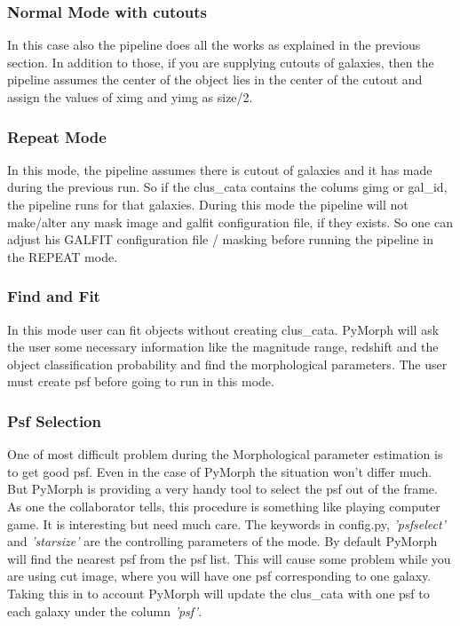 \documentclass[a4paper,12pt]{article}
\begin{document}
\subsubsection{Normal Mode with cutouts}
 In this case also the pipeline does all the works as explained in the previous section. In addition to those, if you are supplying cutouts of galaxies, then the pipeline assumes the center of the object lies in the center of the cutout and assign the values of ximg and yimg as size/2.
\subsubsection{Repeat Mode}
In this mode, the pipeline assumes there is cutout of galaxies and it has made during the previous run. So if the clus\_cata contains the colums gimg or gal\_id, the pipeline runs for that galaxies. During this mode the pipeline will not make/alter any mask image and galfit configuration file, if they exists. So one can adjust his GALFIT configuration file / masking before running the pipeline in the REPEAT mode.
\subsubsection{Find and Fit}
In this mode user can fit objects without creating clus\_cata. PyMorph will ask the user some necessary information like the magnitude range, redshift and the object classification probability and find the morphological
 parameters. The user must create psf before going to run in this mode.
\subsubsection{Psf Selection}
One of most difficult problem during the Morphological parameter estimation is to get good psf. Even in the case of PyMorph the situation won't differ much. But PyMorph is providing a very handy tool to select the psf out of the frame. As one the collaborator tells, this procedure is something like playing computer game. It is interesting but need much care. The keywords in config.py, \textit{'psfselect'} and \textit{'starsize'} are the controlling parameters of the mode. By default PyMorph will find the nearest psf from the psf list. This will cause some problem while you are using cut image, where you will have one psf corresponding to one galaxy. Taking this in to account PyMorph will update the clus\_cata with one psf to each galaxy under the column \textit{'psf'}.
\end{document}
